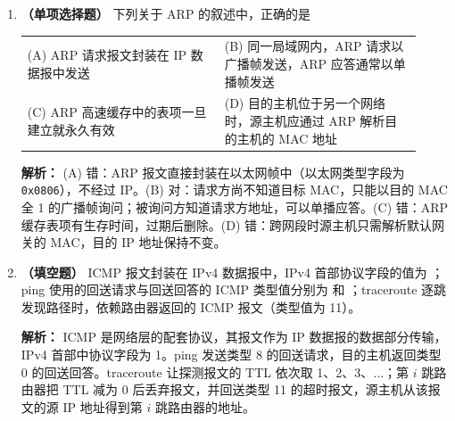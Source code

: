 \begin{enumerate}
\item \textbf{（单项选择题）} 下列关于 ARP 的叙述中，正确的是
\begin{center}
\begin{tabular}{p{0.46\linewidth}p{0.46\linewidth}}
(A) ARP 请求报文封装在 IP 数据报中发送 & (B) 同一局域网内，ARP 请求以广播帧发送，ARP 应答通常以单播帧发送 \\[4pt]
(C) ARP 高速缓存中的表项一旦建立就永久有效 & (D) 目的主机位于另一个网络时，源主机应通过 ARP 解析目的主机的 MAC 地址
\end{tabular}
\end{center}

\ifshowsolutions\par\noindent\textbf{解析：} (A) 错：ARP 报文直接封装在以太网帧中（以太网类型字段为 \texttt{0x0806}），不经过 IP。(B) 对：请求方尚不知道目标 MAC，只能以目的 MAC 全 1 的广播帧询问；被询问方知道请求方地址，可以单播应答。(C) 错：ARP 缓存表项有生存时间，过期后删除。(D) 错：跨网段时源主机只需解析默认网关的 MAC，目的 IP 地址保持不变。\else \answerarea \fi

\item \textbf{（填空题）} ICMP 报文封装在 IPv4 数据报中，IPv4 首部协议字段的值为 \underline{\hspace{2cm}}；ping 使用的回送请求与回送回答的 ICMP 类型值分别为 \underline{\hspace{1.2cm}} 和 \underline{\hspace{1.2cm}}；traceroute 逐跳发现路径时，依赖路由器返回的 ICMP \underline{\hspace{1.6cm}} 报文（类型值为 11）。

\ifshowsolutions\par\noindent\textbf{解析：} ICMP 是网络层的配套协议，其报文作为 IP 数据报的数据部分传输，IPv4 首部中协议字段为 1。ping 发送类型 8 的回送请求，目的主机返回类型 0 的回送回答。traceroute 让探测报文的 TTL 依次取 1、2、3、$\ldots$；第 $i$ 跳路由器把 TTL 减为 0 后丢弃报文，并回送类型 11 的超时报文，源主机从该报文的源 IP 地址得到第 $i$ 跳路由器的地址。\else \answerarea[4] \fi


\end{enumerate}
